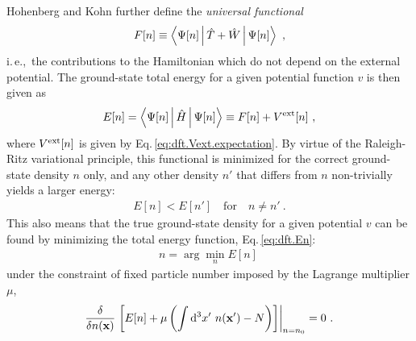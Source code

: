 \documentclass[a4paper,12pt]{book}
\renewcommand{\d}{{\rm d}}
\begin{document}
Hohenberg and Kohn further define the \emph{universal functional} 
\begin{align}
	F[n] \equiv \Braket{\Psi [n] | \hat T + \hat W | \Psi [n]}~,
	\label{eq:dft.Fn}
\end{align}
i.\,e.,~the contributions to the Hamiltonian which do not depend on the external potential. The ground-state total energy for a given potential function $v$ is then given as
\begin{align}
	E [n] 
		= \Braket{\Psi [n] | \hat H | \Psi [n]}
		\equiv F[n] + V^{\rm ext}[n]~,
	\label{eq:dft.En}
\end{align}
where $V^{\rm ext}[n]$ is given by Eq.\,\eqref{eq:dft.Vext.expectation}.
By virtue of the Raleigh-Ritz variational principle, this functional is minimized for the correct ground-state density $n$ only, and any other density $n'$ that differs from $n$ non-trivially yields a larger energy:
\begin{align}
	E[n] < E [n'] \quad \text{for} \quad n \neq n'~.
\end{align}
This also means that the true ground-state density for a given potential $v$ can be found by minimizing the total energy function, Eq.\,\eqref{eq:dft.En}:
\begin{align}
	n = \arg \min_{n} E[n]~
	\label{eq:dft.n}
\end{align}
under the constraint of fixed particle number imposed by the Lagrange multiplier $\mu$,
\begin{align}
	\frac{\delta}{\delta n ({\bf x})}
		\left.\left[ 
			E[n] + \mu \left(
				\int \d^3 x' ~ n ({\bf x}') - N \right)
		\right]\right\vert_{n = n_0}
		=0~.
		\label{eq:dft.stationarity}
\end{align}
\end{document}
